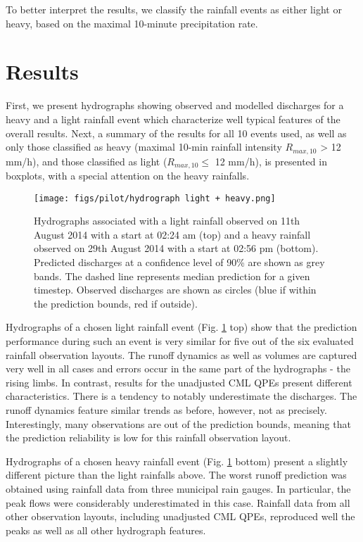 \documentclass{ctuthesis}\usepackage[]{graphicx}\usepackage[]{color}
\begin{document}
To better interpret the results, we classify the rainfall events as either light or heavy, based on the maximal 10-minute precipitation rate. 



\section{Results}

First, we present hydrographs showing observed and modelled discharges for a heavy and a light rainfall event which characterize well typical features of the overall results. Next, a summary of the results for all 10 events used, as well as only those classified as heavy (maximal 10-min rainfall intensity $R_{max,10}$ > 12 mm/h), and those classified as light ($R_{max,10} \leq$ 12 mm/h), is presented in  boxplots, with a special attention on the heavy rainfalls.

\begin{figure}[H]
\begin{center}
\texttt{[image: figs/pilot/hydrograph light + heavy.png]}
\caption{Hydrographs associated with a light rainfall observed on 11th August 2014 with a start at 02:24 am (top) and a heavy rainfall observed on 29th August 2014 with a start at 02:56 pm (bottom). Predicted discharges at a confidence level of 90\% are shown as grey bands. The dashed line represents median prediction for a given timestep. Observed discharges are shown as circles (blue if within the prediction bounds, red if outside).} \label{pil_fig1}
\end{center}
\end{figure}

Hydrographs of a chosen light rainfall event (Fig. \ref{pil_fig1} top) show that the prediction performance during such an event is very similar for five out of the six evaluated rainfall observation layouts. The runoff dynamics as well as volumes are captured very well in all cases and errors occur in the same part of the hydrographs -  the  rising limbs. In contrast, results for the unadjusted CML QPEs present different characteristics. There is a tendency to notably underestimate the discharges. The runoff dynamics feature similar trends as before, however, not as precisely. Interestingly, many observations are out of the prediction bounds, meaning that the prediction reliability is low for this rainfall observation layout.

Hydrographs of a chosen heavy rainfall event (Fig. \ref{pil_fig1} bottom) present a slightly different picture than the light rainfalls above. The worst runoff prediction was obtained using rainfall data from three municipal rain gauges. In particular, the peak flows were considerably underestimated in this case. Rainfall data from all other observation layouts, including unadjusted CML QPEs, reproduced well the peaks as well as all other hydrograph features.
\end{document}
